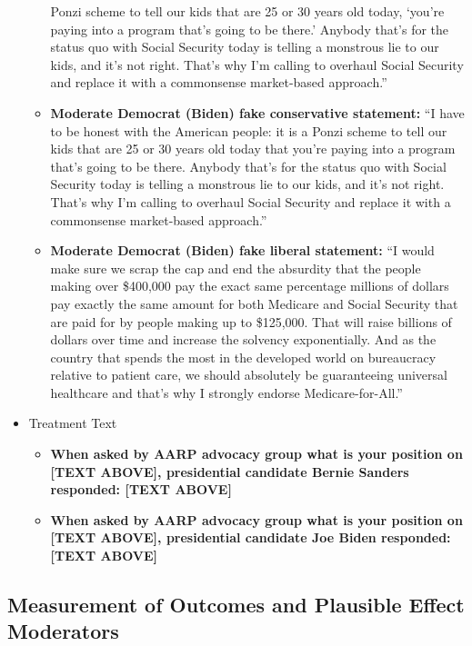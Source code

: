 \begin{itemize}
\begin{itemize}
    Ponzi scheme to tell our kids that are 25 or 30 years old today,
    `you're paying into a program that's going to be there.' Anybody
    that’s for the status quo with Social Security today is telling a
    monstrous lie to our kids, and it's not right. That’s why I'm
    calling to overhaul Social Security and replace it with a
    commonsense market-based approach.''
  \item \textbf{Moderate Democrat (Biden) fake conservative
    statement:} ``I have to be honest with the American people: it is a
    Ponzi scheme to tell our kids that are 25 or 30 years old today
    that you're paying into a program that’s going to be
    there. Anybody that's for the status quo with Social Security
    today is telling a monstrous lie to our kids, and it's not
    right. That's why I'm calling to overhaul Social Security and
    replace it with a commonsense market-based approach.''
  \item \textbf{Moderate Democrat (Biden) fake liberal statement:} ``I
    would make sure we scrap the cap and end the absurdity that the
    people making over \$400,000 pay the exact same percentage
    millions of dollars pay exactly the same amount for both Medicare
    and Social Security that are paid for by people making up to
    \$125,000. That will raise billions of dollars over time and
    increase the solvency exponentially. And as the country that
    spends the most in the developed world on bureaucracy relative to
    patient care, we should absolutely be guaranteeing universal
    healthcare and that's why I strongly endorse Medicare-for-All.''
  \end{itemize}
\item Treatment Text  
  \begin{itemize}
  \item \textbf{When asked by AARP advocacy group what is your position on [TEXT ABOVE], presidential candidate Bernie Sanders responded: [TEXT ABOVE]}
  \item \textbf{When asked by AARP advocacy group what is your position on [TEXT ABOVE], presidential candidate Joe Biden responded: [TEXT ABOVE]}
  \end{itemize}
\end{itemize}  

\subsection{Measurement of Outcomes and Plausible Effect Moderators}


